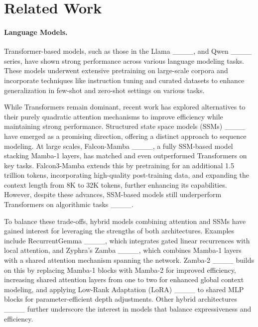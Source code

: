 \section{Related Work}
\paragraph{Language Models.}
Transformer-based models, such as those in the Llama ____, and Qwen ____ series, have shown strong performance across various language modeling tasks. These models underwent extensive pretraining on large-scale corpora and incorporate techniques like instruction tuning and curated datasets to enhance generalization in few-shot and zero-shot settings on various tasks.

While Transformers remain dominant, recent work has explored alternatives to their purely quadratic attention mechanisms to improve efficiency while maintaining strong performance. Structured state space models (SSMs) ____ have emerged as a promising direction, offering a distinct approach to sequence modeling.
At large scales, Falcon-Mamba ____, a fully SSM-based model stacking Mamba-1 layers, has matched and even outperformed Transformers on key tasks. Falcon3-Mamba extends this by pretraining for an additional 1.5 trillion tokens, incorporating high-quality post-training data, and expanding the context length from 8K to 32K tokens, further enhancing its capabilities.
However, despite these advances, SSM-based models still underperform Transformers on algorithmic tasks ____.

To balance these trade-offs, hybrid models combining attention and SSMs have gained interest for leveraging the strengths of both architectures.
Examples include RecurrentGemma ____, which integrates gated linear recurrences with local attention, and Zyphra’s Zamba ____, which combines Mamba-1 layers with a shared attention mechanism spanning the network.
Zamba-2 ____ builds on this by replacing Mamba-1 blocks with Mamba-2 for improved efficiency, increasing shared attention layers from one to two for enhanced global context modeling, and applying Low-Rank Adaptation (LoRA) ____ to shared MLP blocks for parameter-efficient depth adjustments.
Other hybrid architectures ____ further underscore the interest in models that balance expressiveness and efficiency.

